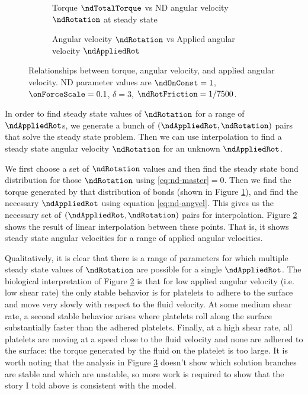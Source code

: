 \begin{figure}
  \centering
  \begin{subfigure}{.48\textwidth}

    \caption{Torque $\ndTotalTorque$ vs ND angular velocity
      $\ndRotation$ at steady state}
    \label{fig:tau-vs-omega}
  \end{subfigure}
  \hfill
  \begin{subfigure}{.48\textwidth}

    \caption{Angular velocity $\ndRotation$ vs Applied angular
      velocity $\ndAppliedRot$}
    \label{fig:omega-vs-omega_f}
  \end{subfigure}
  \caption{Relationships between torque, angular velocity, and applied
    angular velocity. ND parameter values are $\ndOnConst = 1$,
    $\onForceScale = 0.1$, $\delta = 3$, $\ndRotFriction = 1/7500$.}
  \label{fig:steady-state-rolling}
\end{figure}

In order to find steady state values of $\ndRotation$ for a range of
$\ndAppliedRot$s, we generate a bunch of
$(\ndAppliedRot, \ndRotation)$ pairs that solve the steady state
problem. Then we can use interpolation to find a steady state angular
velocity $\ndRotation$ for an unknown $\ndAppliedRot$.

We first choose a set of $\ndRotation$ values and then find the steady
state bond distribution for those $\ndRotation$ using
\eqref{eq:nd-master}$= 0$. Then we find the torque generated by that
distribution of bonds (shown in Figure \ref{fig:tau-vs-omega}), and
find the necessary $\ndAppliedRot$ using equation
\eqref{eq:nd-angvel}. This gives us the necessary set of
$(\ndAppliedRot, \ndRotation)$ pairs for interpolation. Figure
\ref{fig:omega-vs-omega_f} shows the result of linear interpolation
between these points. That is, it shows steady state angular
velocities for a range of applied angular velocities.

Qualitatively, it is clear that there is a range of parameters for
which multiple steady state values of $\ndRotation$ are possible for a
single $\ndAppliedRot$. The biological interpretation of Figure
\ref{fig:omega-vs-omega_f} is that for low applied angular velocity
(i.e. low shear rate) the only stable behavior is for platelets to
adhere to the surface and move very slowly with respect to the fluid
velocity. At some medium shear rate, a second stable behavior arises
where platelets roll along the surface substantially faster than the
adhered platelets. Finally, at a high shear rate, all platelets are
moving at a speed close to the fluid velocity and none are adhered to
the surface: the torque generated by the fluid on the platelet is too
large. It is worth noting that the analysis in Figure
\ref{fig:steady-state-rolling} doesn't show which solution branches
are stable and which are unstable, so more work is required to show
that the story I told above is consistent with the model.

